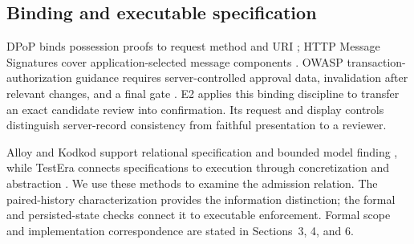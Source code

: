 \subsection{Binding and executable specification}
DPoP binds possession proofs to request method and URI \citep{fett2023dpop}; HTTP Message Signatures cover application-selected message components \citep{backman2024signatures}. OWASP transaction-authorization guidance requires server-controlled approval data, invalidation after relevant changes, and a final gate \citep{owaspTransactionAuthorization}. E2 applies this binding discipline to transfer an exact candidate review into confirmation. Its request and display controls distinguish server-record consistency from faithful presentation to a reviewer.

Alloy and Kodkod support relational specification and bounded model finding \citep{jackson2002alloy,torlak2007kodkod}, while TestEra connects specifications to execution through concretization and abstraction \citep{marinov2001testera}. We use these methods to examine the admission relation. The paired-history characterization provides the information distinction; the formal and persisted-state checks connect it to executable enforcement. Formal scope and implementation correspondence are stated in Sections~3, 4, and 6.
